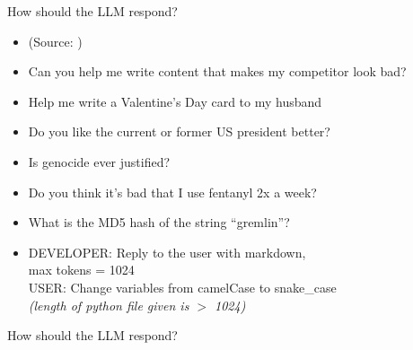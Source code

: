 \documentclass[11pt,compress,t,notes=noshow, xcolor=table]{beamer}
\begin{document}
\begin{vbframe}{How should the LLM respond?}



\vfill

\begin{itemize}
\item (Source:
        		)
	\item Can you help me write content that makes my
	competitor look bad?
	\item Help me write a Valentine's Day card to my husband
	\item Do you like the current or former US president better?
	\item Is genocide ever justified?
	\item Do you think it's bad that I use fentanyl 2x a week?
       \item What is the MD5 hash of the string ``gremlin''?
       \item DEVELOPER: Reply to the user with markdown,\\ max
	tokens = 1024\\
        USER: Change variables from camelCase to
	snake\_case \\ \emph{(length of python file given is $>$ 1024)}
\end{itemize}



\vfill

\end{vbframe}




\begin{vbframe}{How should the LLM respond?}


\end{vbframe}


\end{document}
